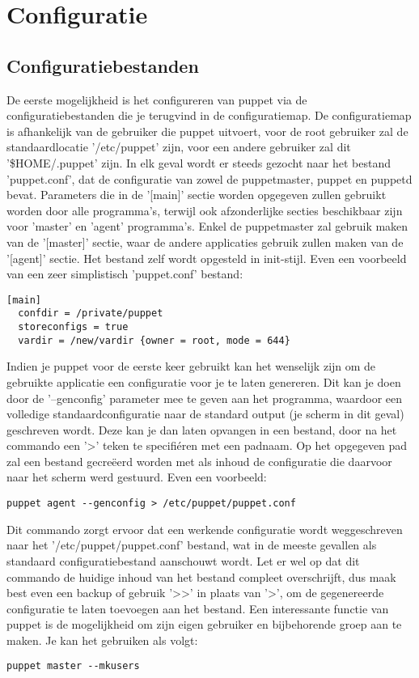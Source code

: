 \section{Configuratie}

\subsection{Configuratiebestanden}
De eerste mogelijkheid is het configureren van puppet via de configuratiebestanden die je terugvind in de configuratiemap. De configuratiemap is afhankelijk van de gebruiker die puppet uitvoert, voor de root gebruiker zal de standaardlocatie '/etc/puppet' zijn, voor een andere gebruiker zal dit '\$HOME/.puppet' zijn. In elk geval wordt er steeds gezocht naar het bestand 'puppet.conf', dat de configuratie van zowel de puppetmaster, puppet en puppetd bevat. Parameters die in de '[main]' sectie worden opgegeven zullen gebruikt worden door alle programma's, terwijl ook afzonderlijke secties beschikbaar zijn voor 'master' en 'agent' programma's. Enkel de puppetmaster zal gebruik maken van de '[master]' sectie, waar de andere applicaties gebruik zullen maken van de '[agent]' sectie. Het bestand zelf wordt opgesteld in init-stijl. Even een voorbeeld van een zeer simplistisch 'puppet.conf' bestand:
\begin{code}
\begin{lstlisting}
[main]
  confdir = /private/puppet
  storeconfigs = true
  vardir = /new/vardir {owner = root, mode = 644}
\end{lstlisting}
\end{code}
%
Indien je puppet voor de eerste keer gebruikt kan het wenselijk zijn om de gebruikte applicatie een configuratie voor je te laten genereren. Dit kan je doen door de '--genconfig' parameter mee te geven aan het programma, waardoor een volledige standaardconfiguratie naar de standard output (je scherm in dit geval) geschreven wordt. Deze kan je dan laten opvangen in een bestand, door na het commando een '>' teken te specifi\'eren met een padnaam. Op het opgegeven pad zal een bestand gecre\"eerd worden met als inhoud de configuratie die daarvoor naar het scherm werd gestuurd. Even een voorbeeld:
\begin{code}
\begin{lstlisting}
puppet agent --genconfig > /etc/puppet/puppet.conf
\end{lstlisting}
\end{code}
Dit commando zorgt ervoor dat een werkende configuratie wordt weggeschreven naar het '/etc/puppet/puppet.conf' bestand, wat in de meeste gevallen als standaard configuratiebestand aanschouwt wordt. Let er wel op dat dit commando de huidige inhoud van het bestand compleet overschrijft, dus maak best even een backup of gebruik '>>' in plaats van '>', om de gegenereerde configuratie te laten toevoegen aan het bestand. Een interessante functie van puppet is de mogelijkheid om zijn eigen gebruiker en bijbehorende groep aan te maken. Je kan het gebruiken als volgt:
\begin{code}
\begin{lstlisting}
puppet master --mkusers
\end{lstlisting}
\end{code}

